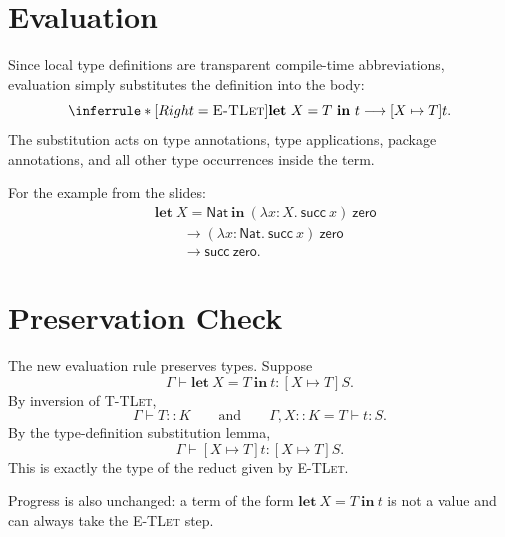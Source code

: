 \documentclass[nonacm]{acmart}
\begin{document}
\section{Evaluation}

Since local type definitions are transparent compile-time abbreviations, evaluation simply substitutes the definition into the body:
\[
\inferrule*[Right=\textsc{E-TLet}]
  { }
  {
    \mathbf{let}\ X = T\ \mathbf{in}\ t
    \longrightarrow
    [X \mapsto T]t
  }.
\]
The substitution acts on type annotations, type applications, package annotations, and all other type occurrences inside the term.

For the example from the slides:
\[
\begin{aligned}
&\mathbf{let}\ X = \mathsf{Nat}\ \mathbf{in}\ 
  (\lambda x:X.\ \mathsf{succ}\ x)\ \mathsf{zero}
\\
&\qquad\longrightarrow
  (\lambda x:\mathsf{Nat}.\ \mathsf{succ}\ x)\ \mathsf{zero}
\\
&\qquad\longrightarrow
  \mathsf{succ}\ \mathsf{zero}.
\end{aligned}
\]

\section{Preservation Check}

The new evaluation rule preserves types.
Suppose
\[
\Gamma \vdash \mathbf{let}\ X = T\ \mathbf{in}\ t : [X \mapsto T]S.
\]
By inversion of \textsc{T-TLet},
\[
\Gamma \vdash T :: K
\qquad\text{and}\qquad
\Gamma, X :: K = T \vdash t : S.
\]
By the type-definition substitution lemma,
\[
\Gamma \vdash [X \mapsto T]t : [X \mapsto T]S.
\]
This is exactly the type of the reduct given by \textsc{E-TLet}.

Progress is also unchanged: a term of the form
$\mathbf{let}\ X = T\ \mathbf{in}\ t$ is not a value and can always take the
\textsc{E-TLet} step.
\end{document}

